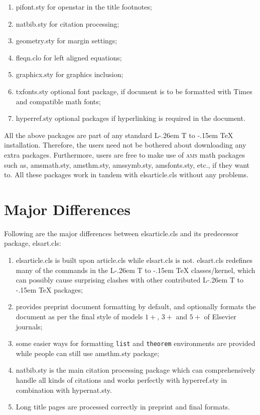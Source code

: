 \documentclass[a4paper,12pt]{article}
\makeatletter
\def\file#1{\textsf{#1}\xspace}
\DeclareRobustCommand{\LaTeX}{L\kern-.26em%
        {\sbox\z@ T%
         \vbox to\ht\z@{\hbox{\check@mathfonts
           \fontsize\sf@size\z@
           \math@fontsfalse\selectfont
          A\,}%
         \vss}%
        }%
     \kern-.15em%
    \TeX}
\makeatother
\begin{document}
\begin{enumerate}[1.]
\advance\itemsep2pt
\item \file{pifont.sty} for openstar in the title footnotes;
\item \file{natbib.sty} for citation processing;
\item \file{geometry.sty} for margin settings;
\item \file{fleqn.clo} for left aligned equations;
\item \file{graphicx.sty} for graphics inclusion;
\item \file{txfonts.sty} optional font package, if document is to
  be formatted with Times and compatible math fonts;
\item \file{hyperref.sty} optional packages if hyperlinking is
  required in the document.

\end{enumerate}

All the above packages are part of any standard \LaTeX{} installation.
Therefore, the users need not be bothered about downloading any
extra packages.  Furthermore, users are free to make use of \textsc{ams}
math packages such as, \file{amsmath.sty}, \file{amsthm.sty},
\file{amssymb.sty}, \file{amsfonts.sty}, etc., if they want to.  All
these packages work in tandem with \file{elsarticle.cls} without
any problems.

\section{Major Differences}
\hypertarget{majordifferences}{}

Following are the major differences between \file{elsarticle.cls}
and its predecessor package, \file{elsart.cls}:

\begin{enumerate}[\textbullet]
\advance\itemsep2pt
\item \file{elsarticle.cls} is built upon \file{article.cls}
while \file{elsart.cls} is not. \file{elsart.cls} redefines
many of the commands in the \LaTeX{} classes/kernel, which can
possibly cause surprising clashes with other contributed
\LaTeX{} packages;

\item provides preprint document formatting by default, and
optionally formats the document as per the final
style of models $1+$, $3+$ and $5+$ of Elsevier journals;

\item some easier ways for formatting \verb+list+ and
\verb+theorem+ environments are provided while people can still
use \file{amsthm.sty} package;

\item \file{natbib.sty} is the main citation processing package
  which can comprehensively handle all kinds of citations and
works perfectly with \file{hyperref.sty} in combination with
\file{hypernat.sty}.

\item Long title pages are processed correctly in preprint and
  final formats.

\end{enumerate}
\end{document}

